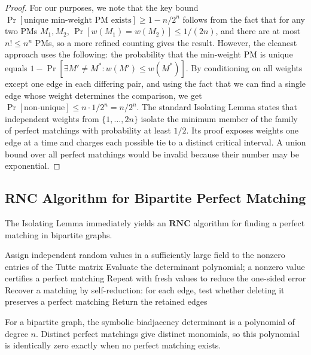 \documentclass[twoside,12pt]{book}
\theoremstyle{plain}
\theoremstyle{definition}
\theoremstyle{remark}
\begin{document}
\begin{proof}
For our purposes, we note that the key bound $\Pr[\text{unique min-weight PM exists}] \geq 1 - n/2^n$ follows from the fact that for any two PMs $M_1, M_2$, $\Pr[w(M_1) = w(M_2)] \leq 1/(2n)$, and there are at most $n! \leq n^n$ PMs, so a more refined counting gives the result. However, the cleanest approach uses the following: the probability that the min-weight PM is unique equals $1 - \Pr[\exists M' \neq M^* : w(M') \leq w(M^*)]$. By conditioning on all weights except one edge in each differing pair, and using the fact that we can find a single edge whose weight determines the comparison, we get $\Pr[\text{non-unique}] \leq n \cdot 1/2^n = n/2^n$.
\fi
The standard Isolating Lemma states that independent weights from
$\{1,\ldots,2n\}$ isolate the minimum member of the family of perfect
matchings with probability at least $1/2$.  Its proof exposes weights one
edge at a time and charges each possible tie to a distinct critical
interval.  A union bound over all perfect matchings would be invalid because
their number may be exponential.
\end{proof}

\subsection{RNC Algorithm for Bipartite Perfect Matching}
\label{subsec:rnc-matching}

The Isolating Lemma immediately yields an $\mathbf{RNC}$ algorithm for finding a perfect matching in bipartite graphs.

\begin{algorithm}[H]
\caption{Randomized Parallel Bipartite Perfect Matching}
\label{alg:bipartite-pm}
\begin{algorithmic}[1]
\State Assign independent random values in a sufficiently large field to the nonzero entries of the Tutte matrix
\State Evaluate the determinant polynomial; a nonzero value certifies a perfect matching
\State Repeat with fresh values to reduce the one-sided error
\State Recover a matching by self-reduction: for each edge, test whether deleting it preserves a perfect matching
\State Return the retained edges
\EndProcedure
\end{algorithmic}
\end{algorithm}

For a bipartite graph, the symbolic biadjacency determinant is a polynomial of
degree $n$. Distinct perfect matchings give distinct monomials, so this
polynomial is identically zero exactly when no perfect matching exists.
\end{document}
